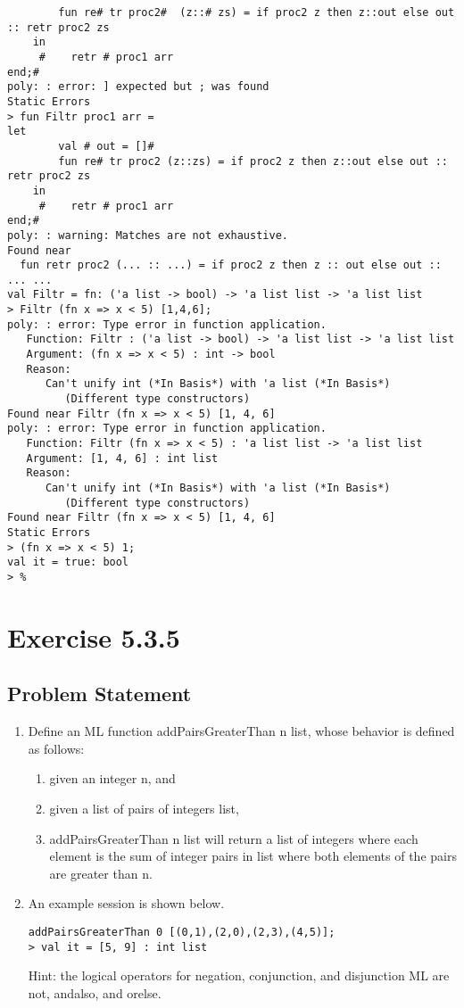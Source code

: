 \documentclass[twoside]{report}
\begin{document}
\begin{scriptsize}
\begin{verbatim}
        fun re# tr proc2#  (z::# zs) = if proc2 z then z::out else out :: retr proc2 zs
    in
     #    retr # proc1 arr
end;#
poly: : error: ] expected but ; was found
Static Errors
> fun Filtr proc1 arr =
let
        val # out = []#
        fun re# tr proc2 (z::zs) = if proc2 z then z::out else out :: retr proc2 zs
    in
     #    retr # proc1 arr
end;#
poly: : warning: Matches are not exhaustive.
Found near
  fun retr proc2 (... :: ...) = if proc2 z then z :: out else out :: ... ...
val Filtr = fn: ('a list -> bool) -> 'a list list -> 'a list list
> Filtr (fn x => x < 5) [1,4,6];
poly: : error: Type error in function application.
   Function: Filtr : ('a list -> bool) -> 'a list list -> 'a list list
   Argument: (fn x => x < 5) : int -> bool
   Reason:
      Can't unify int (*In Basis*) with 'a list (*In Basis*)
         (Different type constructors)
Found near Filtr (fn x => x < 5) [1, 4, 6]
poly: : error: Type error in function application.
   Function: Filtr (fn x => x < 5) : 'a list list -> 'a list list
   Argument: [1, 4, 6] : int list
   Reason:
      Can't unify int (*In Basis*) with 'a list (*In Basis*)
         (Different type constructors)
Found near Filtr (fn x => x < 5) [1, 4, 6]
Static Errors
> (fn x => x < 5) 1;
val it = true: bool
> % 
    \end{verbatim}
\end{scriptsize}

\chapter{Exercise 5.3.5}
\label{cha:5-3-5}
\section{Problem Statement}
\begin{enumerate}
    \item Define an ML function addPairsGreaterThan n list, whose behavior is defined as follows: 
    \begin{enumerate}
        \item given an integer n, and 
        \item given a list of pairs of integers list, 
        \item addPairsGreaterThan n list will return a list of integers where each element is the sum of integer pairs in list where both elements of the pairs are greater than n.
    \end{enumerate}
    \item An example session is shown below.
\begin{scriptsize}
    \begin{verbatim}
addPairsGreaterThan 0 [(0,1),(2,0),(2,3),(4,5)];
> val it = [5, 9] : int list
    \end{verbatim}
\end{scriptsize}
Hint: the logical operators for negation, conjunction, and disjunction ML are not, andalso, and orelse.
\end{enumerate}
\end{document}
